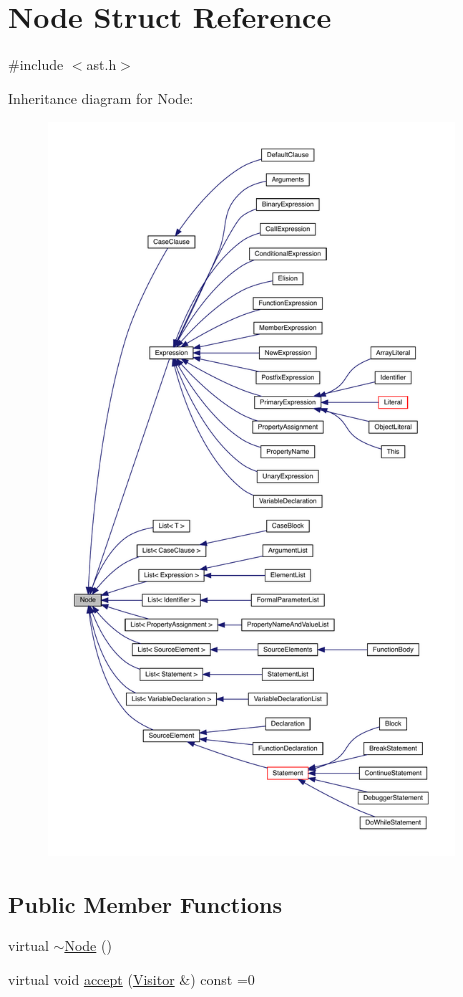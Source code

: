 \hypertarget{struct_node}{}\section{Node Struct Reference}
\label{struct_node}


{\ttfamily \#include $<$ast.\+h$>$}



Inheritance diagram for Node\+:
\nopagebreak
\begin{figure}[H]
\begin{center}
\leavevmode
\includegraphics[height=550pt]{struct_node__inherit__graph}
\end{center}
\end{figure}
\subsection*{Public Member Functions}
\begin{DoxyCompactItemize}
\item 
virtual \hyperlink{struct_node_af5e3fa79300bf5f3f2f3ecae6e795a94}{$\sim$\+Node} ()
\item 
virtual void \hyperlink{struct_node_a10bd7af968140bbf5fa461298a969c71}{accept} (\hyperlink{struct_visitor}{Visitor} \&) const =0
\end{DoxyCompactItemize}


